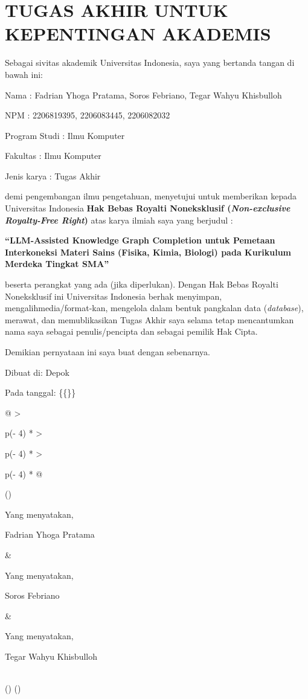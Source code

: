 \documentclass[
]{article}
\begin{document}
\hypertarget{tugas-akhir-untuk-kepentingan-akademis}{%
\section{TUGAS AKHIR UNTUK KEPENTINGAN
AKADEMIS}\label{tugas-akhir-untuk-kepentingan-akademis}}

Sebagai sivitas akademik Universitas Indonesia, saya yang bertanda
tangan di bawah ini:

Nama : Fadrian Yhoga Pratama, Soros Febriano, Tegar Wahyu Khisbulloh

NPM : 2206819395, 2206083445, 2206082032

Program Studi : Ilmu Komputer

Fakultas : Ilmu Komputer

Jenis karya : Tugas Akhir

demi pengembangan ilmu pengetahuan, menyetujui untuk memberikan kepada
Universitas Indonesia \textbf{Hak Bebas Royalti Noneksklusif
(\emph{Non-exclusive Royalty-Free Right})} atas karya ilmiah saya yang
berjudul :

\textbf{``LLM-Assisted Knowledge Graph Completion untuk Pemetaan
Interkoneksi Materi Sains (Fisika, Kimia, Biologi) pada Kurikulum
Merdeka Tingkat SMA''}

beserta perangkat yang ada (jika diperlukan). Dengan Hak Bebas Royalti
Noneksklusif ini Universitas Indonesia berhak menyimpan,
mengalihmedia/format-kan, mengelola dalam bentuk pangkalan data
(\emph{database}), merawat, dan memublikasikan Tugas Akhir saya selama
tetap mencantumkan nama saya sebagai penulis/pencipta dan sebagai
pemilik Hak Cipta.

Demikian pernyataan ini saya buat dengan sebenarnya.

Dibuat di: Depok

Pada tanggal: \{\{\}\}

\begin{longtable}[]{@{}
  >{\raggedright\arraybackslash}p{(\columnwidth - 4\tabcolsep) * }
  >{\raggedright\arraybackslash}p{(\columnwidth - 4\tabcolsep) * }
  >{\raggedright\arraybackslash}p{(\columnwidth - 4\tabcolsep) * }@{}}
\toprule()
\begin{minipage}[b]{\linewidth}\raggedright
Yang menyatakan,

Fadrian Yhoga Pratama
\end{minipage} & \begin{minipage}[b]{\linewidth}\raggedright
Yang menyatakan,

Soros Febriano
\end{minipage} & \begin{minipage}[b]{\linewidth}\raggedright
Yang menyatakan,

Tegar Wahyu Khisbulloh
\end{minipage} \\
\midrule()
\endhead
\bottomrule()
\end{longtable}
\end{document}
